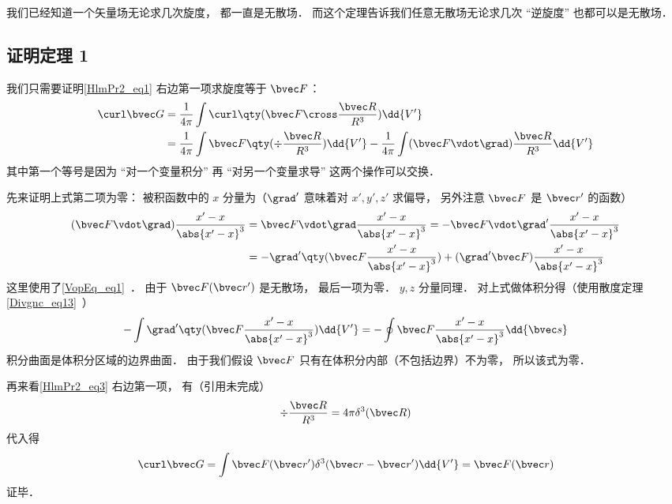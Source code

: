 我们已经知道一个矢量场无论求几次旋度， 都一直是无散场． 而这个定理告诉我们任意无散场无论求几次 “逆旋度” 也都可以是无散场．

\subsection{证明定理 1}
我们只需要证明\autoref{HlmPr2_eq1} 右边第一项求旋度等于 $\bvec F$：
\begin{equation}\label{HlmPr2_eq3}
\begin{aligned}
\curl \bvec G &= \frac{1}{4\pi}\int \curl \qty(\bvec F \cross \frac{\bvec R}{R^3}) \dd{V'}\\
&= \frac{1}{4\pi}\int\bvec F \qty(\div \frac{\bvec R}{R^3}) \dd{V'} -  \frac{1}{4\pi}\int(\bvec F \vdot \grad) \frac{\bvec R}{R^3} \dd{V'}
\end{aligned}
\end{equation}
其中第一个等号是因为 “对一个变量积分” 再 “对另一个变量求导” 这两个操作可以交换． %

先来证明上式第二项为零： 被积函数中的 $x$ 分量为（$\grad'$ 意味着对 $x', y', z'$ 求偏导， 另外注意 $\bvec F$ 是 $\bvec r'$ 的函数）
\begin{equation}\label{HlmPr2_eq2}
\begin{aligned}
(\bvec F \vdot \grad) \frac{x' - x}{\abs{x'-x}^3} &= \bvec F \vdot \grad \frac{x' - x}{\abs{x'-x}^3} = -\bvec F \vdot \grad' \frac{x' - x}{\abs{x'-x}^3}\\
&= - \grad'\qty(\bvec F \frac{x' - x}{\abs{x'-x}^3}) + (\grad'\bvec F) \frac{x' - x}{\abs{x'-x}^3}
\end{aligned}
\end{equation}
这里使用了\autoref{VopEq_eq1}~． 由于 $\bvec F(\bvec r')$ 是无散场， 最后一项为零． $y, z$ 分量同理． 对上式做体积分得（使用散度定理\autoref{Divgnc_eq13}~）
\begin{equation}
- \int \grad'\qty(\bvec F \frac{x' - x}{\abs{x'-x}^3})\dd{V'} = -\oint \bvec F \frac{x' - x}{\abs{x'-x}^3} \dd{\bvec s}
\end{equation}
积分曲面是体积分区域的边界曲面． 由于我们假设 $\bvec F$ 只有在体积分内部（不包括边界）不为零， 所以该式为零．

再来看\autoref{HlmPr2_eq3} 右边第一项， 有（引用未完成）
\begin{equation}
\div \frac{\bvec R}{R^3} = 4\pi \delta^3(\bvec R)
\end{equation}
代入得
\begin{equation}
\curl \bvec G = \int \bvec F(\bvec r') \delta^3(\bvec r - \bvec r') \dd{V'} = \bvec F(\bvec r)
\end{equation}
证毕．

